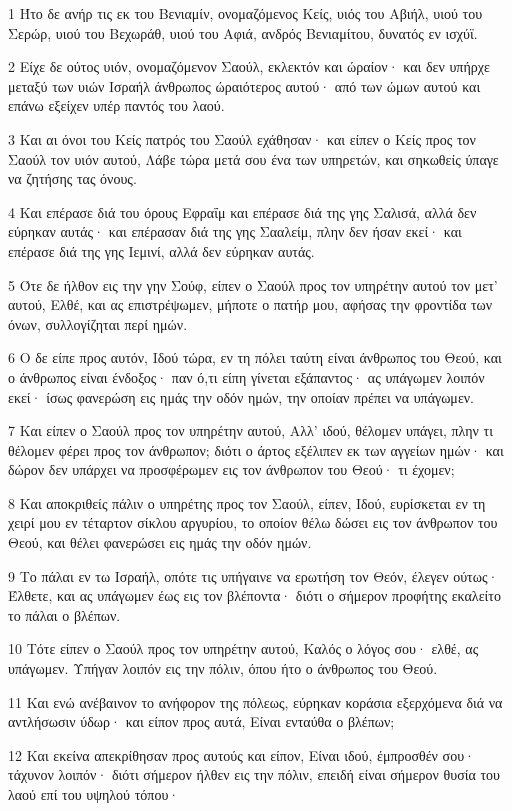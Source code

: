 \par 1 Ήτο δε ανήρ τις εκ του Βενιαμίν, ονομαζόμενος Κείς, υιός του Αβιήλ, υιού του Σερώρ, υιού του Βεχωράθ, υιού του Αφιά, ανδρός Βενιαμίτου, δυνατός εν ισχύϊ.
\par 2 Είχε δε ούτος υιόν, ονομαζόμενον Σαούλ, εκλεκτόν και ώραίον· και δεν υπήρχε μεταξύ των υιών Ισραήλ άνθρωπος ώραιότερος αυτού· από των ώμων αυτού και επάνω εξείχεν υπέρ παντός του λαού.
\par 3 Και αι όνοι του Κείς πατρός του Σαούλ εχάθησαν· και είπεν ο Κείς προς τον Σαούλ τον υιόν αυτού, Λάβε τώρα μετά σου ένα των υπηρετών, και σηκωθείς ύπαγε να ζητήσης τας όνους.
\par 4 Και επέρασε διά του όρους Εφραΐμ και επέρασε διά της γης Σαλισά, αλλά δεν εύρηκαν αυτάς· και επέρασαν διά της γης Σααλείμ, πλην δεν ήσαν εκεί· και επέρασε διά της γης Ιεμινί, αλλά δεν εύρηκαν αυτάς.
\par 5 Ότε δε ήλθον εις την γην Σούφ, είπεν ο Σαούλ προς τον υπηρέτην αυτού τον μετ' αυτού, Ελθέ, και ας επιστρέψωμεν, μήποτε ο πατήρ μου, αφήσας την φροντίδα των όνων, συλλογίζηται περί ημών.
\par 6 Ο δε είπε προς αυτόν, Ιδού τώρα, εν τη πόλει ταύτη είναι άνθρωπος του Θεού, και ο άνθρωπος είναι ένδοξος· παν ό,τι είπη γίνεται εξάπαντος· ας υπάγωμεν λοιπόν εκεί· ίσως φανερώση εις ημάς την οδόν ημών, την οποίαν πρέπει να υπάγωμεν.
\par 7 Και είπεν ο Σαούλ προς τον υπηρέτην αυτού, Αλλ' ιδού, θέλομεν υπάγει, πλην τι θέλομεν φέρει προς τον άνθρωπον; διότι ο άρτος εξέλιπεν εκ των αγγείων ημών· και δώρον δεν υπάρχει να προσφέρωμεν εις τον άνθρωπον του Θεού· τι έχομεν;
\par 8 Και αποκριθείς πάλιν ο υπηρέτης προς τον Σαούλ, είπεν, Ιδού, ευρίσκεται εν τη χειρί μου εν τέταρτον σίκλου αργυρίου, το οποίον θέλω δώσει εις τον άνθρωπον του Θεού, και θέλει φανερώσει εις ημάς την οδόν ημών.
\par 9 Το πάλαι εν τω Ισραήλ, οπότε τις υπήγαινε να ερωτήση τον Θεόν, έλεγεν ούτως· Έλθετε, και ας υπάγωμεν έως εις τον βλέποντα· διότι ο σήμερον προφήτης εκαλείτο το πάλαι ο βλέπων.
\par 10 Τότε είπεν ο Σαούλ προς τον υπηρέτην αυτού, Καλός ο λόγος σου· ελθέ, ας υπάγωμεν. Υπήγαν λοιπόν εις την πόλιν, όπου ήτο ο άνθρωπος του Θεού.
\par 11 Και ενώ ανέβαινον το ανήφορον της πόλεως, εύρηκαν κοράσια εξερχόμενα διά να αντλήσωσιν ύδωρ· και είπον προς αυτά, Είναι ενταύθα ο βλέπων;
\par 12 Και εκείνα απεκρίθησαν προς αυτούς και είπον, Είναι ιδού, έμπροσθέν σου· τάχυνον λοιπόν· διότι σήμερον ήλθεν εις την πόλιν, επειδή είναι σήμερον θυσία του λαού επί του υψηλού τόπου·
